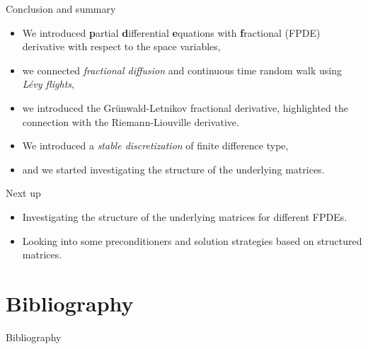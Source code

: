 \documentclass[aspectratio=169,xcolor=dvipsnames]{beamer}
\newcommand\unnumbered{\setbeamertemplate{footline}{}}%
\begin{document}
\begin{frame}{Conclusion and summary}

\begin{itemize}
	\item[\textcolor{success}{\faCheckCircle}] We introduced \textbf{p}artial \textbf{d}ifferential \textbf{e}quations with \textbf{f}ractional (FPDE) derivative with respect to the space variables,
	\item[\textcolor{success}{\faCheckCircle}] we connected \emph{fractional diffusion} and continuous time random walk using \emph{L\'evy flights},
	\item[\textcolor{success}{\faCheckCircle}] we introduced the Gr\"unwald-Letnikov fractional derivative, highlighted the connection with the Riemann-Liouville derivative.
	\item[\textcolor{success}{\faCheckCircle}] We introduced a \emph{stable discretization} of finite difference type,
	\item[\textcolor{success}{\faCheckCircle}] and we started investigating the structure of the underlying matrices.
\end{itemize}

Next up
\begin{itemize}
	\item[\textcolor{todo}{\faClipboardList}] Investigating the structure of the underlying matrices for different FPDEs.
	\item[\textcolor{todo}{\faClipboardList}] Looking into some preconditioners and solution strategies based on structured matrices.
\end{itemize}

\end{frame}

\appendix

\section*{Bibliography}
{\unnumbered
	\begin{frame}{Bibliography}
	\small
	\printbibliography
	
\end{frame}
}
\end{document}
